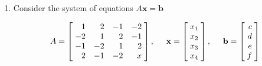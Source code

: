 \documentclass[a4paper]{article}
\begin{document}
\begin{enumerate}[label=\textbf{\arabic*.}]
	\item Consider the system of equations $A\textbf{x} = \textbf{b}$

			$$
			A =
			\begin{bmatrix*}[r]
				\hspace{1mm} 1 & 2 & -1 & -2 \hspace{1mm}\\
				\hspace{1mm}-2 & 1 & 2 & -1 \hspace{1mm}\\
				\hspace{1mm} -1 & -2 & 1 & 2 \hspace{1mm}\\
				\hspace{1mm} 2 & -1 & -2 & x \hspace{1mm}\\
			\end{bmatrix*}
			,
			\hspace{5mm}
			\textbf{x} = 
			\begin{bmatrix*}[r]
				\hspace{1mm} x_1 \hspace{1mm}\\
				\hspace{1mm} x_2 \hspace{1mm}\\
				\hspace{1mm} x_3 \hspace{1mm}\\
				\hspace{1mm} x_4 \hspace{1mm}\\
			\end{bmatrix*}
			,
			\hspace{5mm}
			\textbf{b} =
			\begin{bmatrix*}[r]
				\hspace{1mm} c \hspace{1mm}\\
				\hspace{1mm} d \hspace{1mm}\\
				\hspace{1mm} e \hspace{1mm}\\
				\hspace{1mm} f \hspace{1mm}\\
			\end{bmatrix*}
			$$


\end{enumerate}
\end{document}
